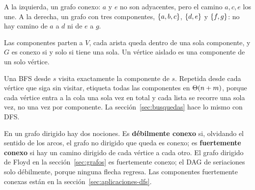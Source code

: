 \documentclass[11pt,letterpaper]{article}
\begin{document}
\begin{ejemplo}[Diapositivas 95 y 100]
  \label{ej:componentes-teoria}
  A la izquierda, un grafo conexo: $a$ y $e$ no son adyacentes, pero
  el camino $a, c, e$ los une. A la derecha, un grafo con tres
  componentes, $\left\{ a,b,c \right\}$, $\left\{ d,e \right\}$ y $\left\{ f,g \right\}$: no hay camino
  de $a$ a $d$ ni de $e$ a $g$.
  \begin{center}
  \end{center}
\end{ejemplo}

Las componentes parten a $V$, cada arista queda dentro de una sola
componente, y $G$ es conexo si y solo si tiene una sola. Un vértice
aislado es una componente de un solo vértice.

Una BFS desde $s$ visita exactamente la componente de $s$. Repetida
desde cada vértice que siga sin visitar, etiqueta todas las
componentes en $\Theta\!\left(n + m\right)$, porque cada vértice entra a la cola una
sola vez en total y cada lista se recorre una sola vez, no una vez por
componente. La sección~\ref{sec:busquedas} hace lo mismo con DFS.

En un grafo dirigido hay dos nociones. Es \textbf{débilmente conexo}
si, olvidando el sentido de los arcos, el grafo no dirigido que queda
es conexo; es \textbf{fuertemente conexo} si hay un camino dirigido de
cada vértice a cada otro. El grafo dirigido de Floyd en la
sección~\ref{sec:grafos} es fuertemente conexo; el DAG de seriaciones
solo débilmente, porque ninguna flecha regresa. Las componentes
fuertemente conexas están en la sección~\ref{sec:aplicaciones-dfs}.
\end{document}
